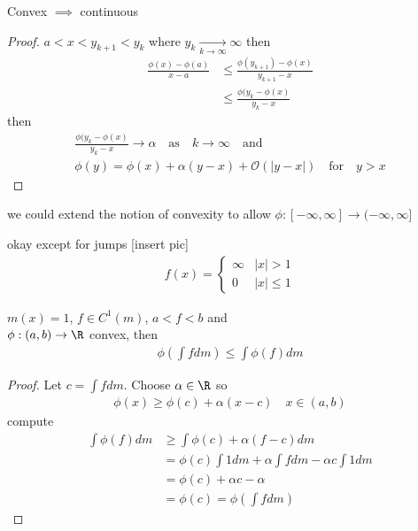 \begin{lemma}
	Convex $\implies$ continuous
\end{lemma}

\begin{proof}
	$a < x < y_{k+1} < y_{k}$ where $y_{k} \xrightarrow[k \to \infty]{} \infty$ then
	\begin{align*}
		\frac{\phi(x) - \phi(a)}{x - a} &\leq \frac{\phi(y_{k+1}) - \phi (x)}{y_{k+1} - x} \\
										&\leq \frac{\phi(y_{k} - \phi(x)}{y_{k} - x}
	\end{align*} then
	\begin{align*}
		\frac{\phi(y_{k} - \phi(x)}{y_{k} - x} \to \alpha \quad \text{as} \quad k \to \infty \quad \text{and} \\
		\phi(y) = \phi(x) + \alpha (y - x) + \mathcal{O}( | y -x|) \quad \text{for} \quad y > x
	\end{align*} 
\end{proof}

\begin{remark}
	we could extend the notion of convexity to allow $\phi : [-\infty, \infty] \to (-\infty, \infty]$ 
	\begin{lemma}
		okay except for jumps [insert pic]
		\begin{align*}
			f(x) =
			\begin{cases}
				\infty & |x| > 1 \\
				0 &|x| \leq 1
			\end{cases}
		\end{align*} 
	\end{lemma}
	
\end{remark}

\begin{theorem}
	$m(x) = 1$, $f \in C^{1}(m)$, $a < f < b$ and \\ 
	$\phi : (a,b) \to \R$ convex, then
	\begin{align*}
		\phi\left(\int f dm \right) \leq \int \phi(f) dm
	\end{align*} 
\end{theorem}

\begin{proof}
	Let $c = \int f dm$. Choose $\alpha \in \R$ so
	\begin{align*}
		\phi (x) \geq \phi (c) + \alpha (x - c) \quad x \in (a,b)
	\end{align*} 
	compute
	\begin{align*}
		\int \phi (f) dm &\geq \int \phi (c) + \alpha (f -c) dm \\
						 &= \phi (c) \int 1 dm + \alpha \int f dm - \alpha c \int 1 dm \\
						 &= \phi (c) + \alpha c - \alpha \\
						 &= \phi (c) = \phi \left( \int f dm \right)
	\end{align*}
\end{proof}

